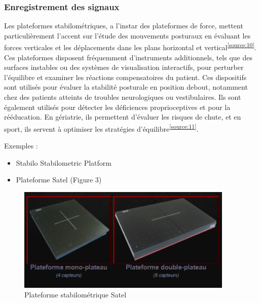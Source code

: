 \subsubsection{Enregistrement des signaux}
Les plateformes stabilométriques, a l’instar des plateformes de force, mettent particulièrement l’accent sur l'étude des mouvements posturaux en évaluant les forces verticales et les déplacements dans les plans horizontal et vertical\textsuperscript{\ref{source:10}}. 
Ces plateformes disposent fréquemment d’instruments additionnels, tels que des surfaces instables ou des systèmes de visualisation interactifs, pour perturber l'équilibre et examiner les réactions compensatoires du patient. 
Ces dispositifs sont utilisés pour évaluer la stabilité posturale en position debout, notamment chez des patients atteints de troubles neurologiques ou vestibulaires. 
Ils sont également utilisés pour détecter les déficiences proprioceptives et pour la rééducation.
En gériatrie, ils permettent d'évaluer les risques de chute, et en sport, ils servent à optimiser les stratégies d'équilibre\textsuperscript{\ref{source:11}}. 

Exemples : 
\begin{itemize}
    \item Stabilo Stabilometric Platform 
    \item Plateforme  Satel (Figure 3)
\end{itemize}

\begin{figure}[H]
    \centering
    \includegraphics[height=5cm]{images/pression_plantaire/satel.png}
    \caption{Plateforme stabilométrique Satel}\label{fig:satel}
\end{figure}
 
